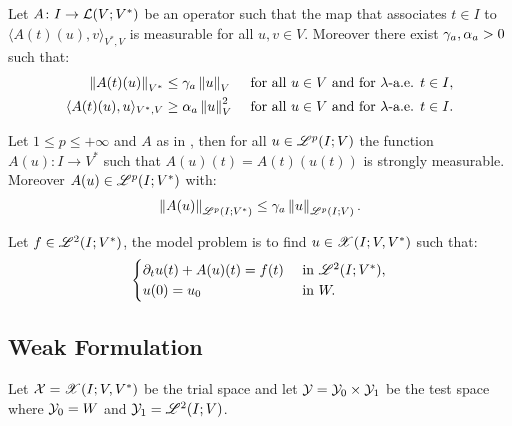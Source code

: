 \begin{definition}[$A$] \label{definition:A} %
    Let $A \colon I \rightarrow \mathcal{L}(V;V^*)$ be an operator such that the map that associates $t \in I$ to $\langle A(t)(u), v \rangle_{V^*, V}$ is measurable for all $u, v \in V$. Moreover there exist $\gamma_{a}, \alpha_{a} > 0$ such that:
    \begin{align} \label{equation:a}
        \left\lVert A(t)(u) \right\rVert_{V^*} & \leq \gamma_{a} \left\lVert u \right\rVert_V &\text{ for all } u \in V \text{ and for } \lambda \text{-a.e. } t \in I, \\
        \langle A(t)(u), u \rangle_{V^*, V} & \geq \alpha_{a} \left\lVert u \right\rVert_V^2 &\text{ for all } u \in V \text{ and for } \lambda \text{-a.e. } t \in I.
    \end{align}
\end{definition}

\begin{lemma}
    Let $1 \leq p \leq +\infty$ and  $A$ as in , then for all $u \in \mathscr{L}^{p}(I; V)$ the function $A(u) \colon I \rightarrow V^*$ such that $A(u)(t) = A(t)(u(t))$ is strongly measurable. Moreover $A(u) \in \mathscr{L}^{p}(I; V^*)$ with:
    \begin{align}
        \left\lVert A(u) \right\rVert_{\mathscr{L}^{p}(I; V^*)} \leq \gamma_{a} \left\lVert u \right\rVert_{\mathscr{L}^{p}(I; V)}.
    \end{align}
\end{lemma}

\begin{definition}
    Let $f \in \mathscr{L}^{2}(I; V^*)$, the model problem is to find $u \in \mathscr{X}(I; V, V^*)$ such that:
    \begin{align}
        \begin{cases} \label{equation:model}
            \partial_t u(t) + A(u)(t) = f(t) & \text{ in } \mathscr{L}^{2}(I; V^*), \\
            u(0) = u_0 & \text{ in } W.
        \end{cases}
    \end{align}
\end{definition}

\newpage
\subsection{Weak Formulation} \label{subsection:weak_formulation}

\begin{definition}
    Let $\mathcal{X} = \mathscr{X}(I; V, V^*)$ be the trial space and let $\mathcal{Y} = \mathcal{Y}_0 \times \mathcal{Y}_1$ be the test space where $\mathcal{Y}_0 = W$ and $\mathcal{Y}_1 = \mathscr{L}^{2}(I; V)$.
\end{definition}


